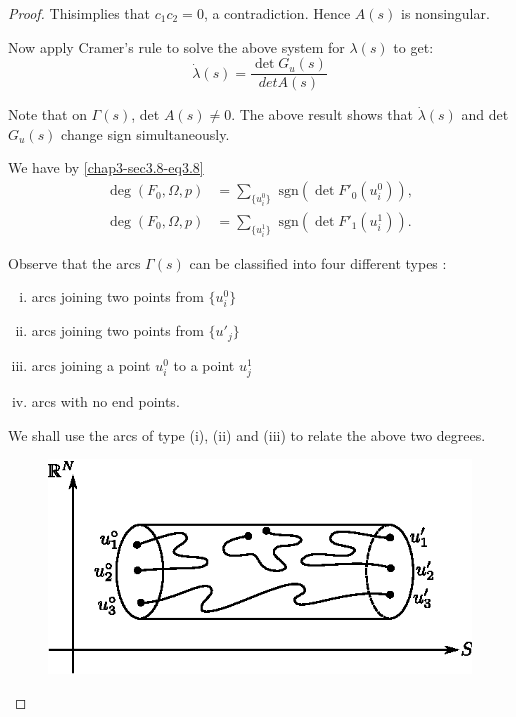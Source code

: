 \begin{proof}
This\pageoriginale implies that $c_1 c_2 = 0$, a contradiction. Hence
$A(s)$ is nonsingular.  

Now apply Cramer's rule to solve the above system for $\lambda (s)$ to
get: 
\begin{equation*}
\dot{\lambda} (s) = \frac{\det G_u(s)}{det A(s)}
\tag{3.12b}\label{chap3-sec3.11-eq3.12b} 
\end{equation*}

Note that on $\Gamma(s)$,  det $A(s) \neq 0$.  The above result shows
that $\dot{\lambda} (s)$ and det $G_u (s)$ change sign simultaneously. 

We have by \eqref{chap3-sec3.8-eq3.8}
\begin{align*}
\deg (F_0, \Omega , p) & = \sum_{\{ u^0_i \}} \text{ sgn} (\det F'_0
(u^0_i)), \\ 
\deg (F_0, \Omega , p) & = \sum_{\{ u^1_i \}} \text{ sgn} (\det F'_1
(u^1_i)).  
\end{align*}

Observe that the arcs $\Gamma(s)$ can be classified into four
different types : 
\begin{enumerate}[(i)]
\item arcs joining two points from $\{ u^0_i \}$

\item arcs joining two points from $\{ u'_j \}$

\item arcs joining a point $u^0_i$ to a point $ u^1_j $

\item arcs with no end points.
\end{enumerate}

We shall use the arcs of type (i), (ii) and (iii) to relate the
above two degrees. 

\begin{figure}[H]
\centering
\includegraphics{vol79-fig/fig79-20.eps}
\smallskip
\caption{}
\label{chap3-fig3.2}
\end{figure}


\end{proof}
